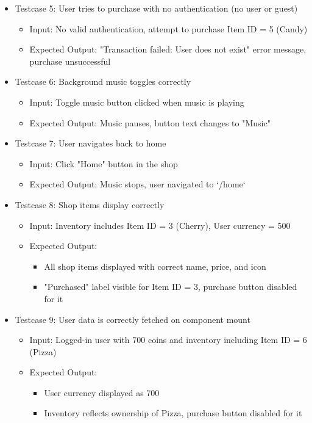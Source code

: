 \begin{itemize}
    \item Testcase 5: User tries to purchase with no authentication (no user or guest)
    \begin{itemize}
        \item Input: No valid authentication, attempt to purchase Item ID = 5 (Candy)
        \item Expected Output: "Transaction failed: User does not exist" error message, purchase unsuccessful
    \end{itemize}

    \item Testcase 6: Background music toggles correctly
    \begin{itemize}
        \item Input: Toggle music button clicked when music is playing
        \item Expected Output: Music pauses, button text changes to "Music"
    \end{itemize}

    \item Testcase 7: User navigates back to home
    \begin{itemize}
        \item Input: Click "Home" button in the shop
        \item Expected Output: Music stops, user navigated to `/home`
    \end{itemize}

    \item Testcase 8: Shop items display correctly
    \begin{itemize}
        \item Input: Inventory includes Item ID = 3 (Cherry), User currency = 500
        \item Expected Output:
        \begin{itemize}
            \item All shop items displayed with correct name, price, and icon
            \item "Purchased" label visible for Item ID = 3, purchase button disabled for it
        \end{itemize}
    \end{itemize}

    \item Testcase 9: User data is correctly fetched on component mount
    \begin{itemize}
        \item Input: Logged-in user with 700 coins and inventory including Item ID = 6 (Pizza)
        \item Expected Output:
        \begin{itemize}
            \item User currency displayed as 700
            \item Inventory reflects ownership of Pizza, purchase button disabled for it
        \end{itemize}
    \end{itemize}
\end{itemize}
